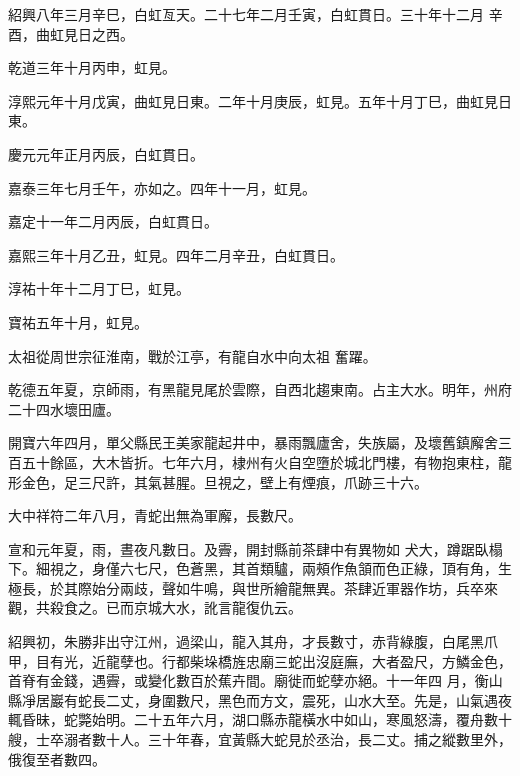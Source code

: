 \begin{pinyinscope}
 紹興八年三月辛巳，白虹亙天。二十七年二月壬寅，白虹貫日。三十年十二月
 辛酉，曲虹見日之西。



 乾道三年十月丙申，虹見。



 淳熙元年十月戊寅，曲虹見日東。二年十月庚辰，虹見。五年十月丁巳，曲虹見日東。



 慶元元年正月丙辰，白虹貫日。



 嘉泰三年七月壬午，亦如之。四年十一月，虹見。



 嘉定十一年二月丙辰，白虹貫日。



 嘉熙三年十月乙丑，虹見。四年二月辛丑，白虹貫日。



 淳祐十年十二月丁巳，虹見。



 寶祐五年十月，虹見。



 太祖從周世宗征淮南，戰於江亭，有龍自水中向太祖
 奮躍。



 乾德五年夏，京師雨，有黑龍見尾於雲際，自西北趨東南。占主大水。明年，州府二十四水壞田廬。



 開寶六年四月，單父縣民王美家龍起井中，暴雨飄廬舍，失族屬，及壞舊鎮廨舍三百五十餘區，大木皆折。七年六月，棣州有火自空墮於城北門樓，有物抱東柱，龍形金色，足三尺許，其氣甚腥。旦視之，壁上有煙痕，爪跡三十六。



 大中祥符二年八月，青蛇出無為軍廨，長數尺。



 宣和元年夏，雨，晝夜凡數日。及霽，開封縣前茶肆中有異物如
 犬大，蹲踞臥榻下。細視之，身僅六七尺，色蒼黑，其首類驢，兩頰作魚頷而色正綠，頂有角，生極長，於其際始分兩歧，聲如牛鳴，與世所繪龍無異。茶肆近軍器作坊，兵卒來觀，共殺食之。已而京城大水，訛言龍復仇云。



 紹興初，朱勝非出守江州，過梁山，龍入其舟，才長數寸，赤背綠腹，白尾黑爪甲，目有光，近龍孽也。行都柴垛橋旌忠廟三蛇出沒庭廡，大者盈尺，方鱗金色，首脊有金錢，遇霽，或變化數百於蕉卉間。廟徙而蛇孽亦絕。十一年四
 月，衡山縣凈居巖有蛇長二丈，身圍數尺，黑色而方文，震死，山水大至。先是，山氣遇夜輒昏昧，蛇斃始明。二十五年六月，湖口縣赤龍橫水中如山，寒風怒濤，覆舟數十艘，士卒溺者數十人。三十年春，宜黃縣大蛇見於丞治，長二丈。捕之縱數里外，俄復至者數四。




\end{pinyinscope}
